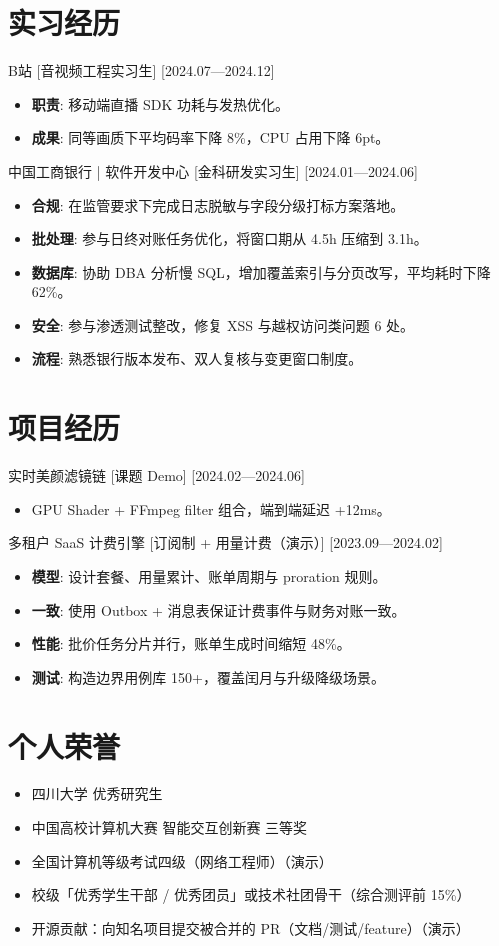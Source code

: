 \documentclass{resume-photo}
\begin{document}
\section{实习经历}
\ResumeItem
{B站}
[\textnormal{音视频工程实习生}]
[2024.07—2024.12]

\begin{itemize}
  \item \textbf{职责}: 移动端直播 SDK 功耗与发热优化。
  \item \textbf{成果}: 同等画质下平均码率下降 8\%，CPU 占用下降 6pt。
\end{itemize}


\ResumeItem
{中国工商银行 | 软件开发中心}
[\textnormal{金科研发实习生}]
[2024.01—2024.06]

\begin{itemize}
  \item \textbf{合规}: 在监管要求下完成日志脱敏与字段分级打标方案落地。
  \item \textbf{批处理}: 参与日终对账任务优化，将窗口期从 4.5h 压缩到 3.1h。
  \item \textbf{数据库}: 协助 DBA 分析慢 SQL，增加覆盖索引与分页改写，平均耗时下降 62\%。
  \item \textbf{安全}: 参与渗透测试整改，修复 XSS 与越权访问类问题 6 处。
  \item \textbf{流程}: 熟悉银行版本发布、双人复核与变更窗口制度。
\end{itemize}



\section{项目经历}
\ResumeItem
{实时美颜滤镜链}
[\textnormal{课题 Demo}]
[2024.02—2024.06]

\begin{itemize}
  \item GPU Shader + FFmpeg filter 组合，端到端延迟 +12ms。
\end{itemize}


\ResumeItem
{多租户 SaaS 计费引擎}
[\textnormal{订阅制 + 用量计费（演示）}]
[2023.09—2024.02]

\begin{itemize}
  \item \textbf{模型}: 设计套餐、用量累计、账单周期与 proration 规则。
  \item \textbf{一致}: 使用 Outbox + 消息表保证计费事件与财务对账一致。
  \item \textbf{性能}: 批价任务分片并行，账单生成时间缩短 48\%。
  \item \textbf{测试}: 构造边界用例库 150+，覆盖闰月与升级降级场景。
\end{itemize}



\section{个人荣誉}
\begin{itemize}
  \item 四川大学 优秀研究生
  \item 中国高校计算机大赛 智能交互创新赛 三等奖
  \item 全国计算机等级考试四级（网络工程师）（演示）
  \item 校级「优秀学生干部 / 优秀团员」或技术社团骨干（综合测评前 15\%）
  \item 开源贡献：向知名项目提交被合并的 PR（文档/测试/feature）（演示）
\end{itemize}
\end{document}
